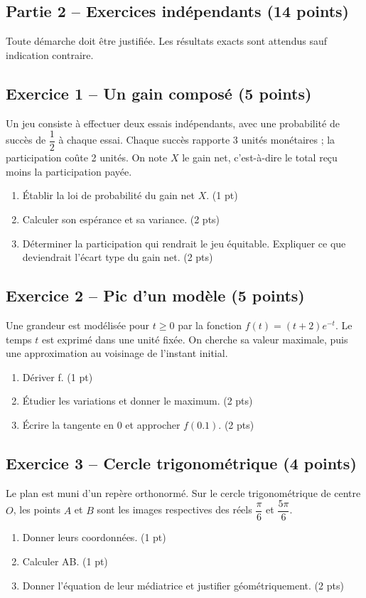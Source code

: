 \mxnewpage\subsection*{Partie 2 -- Exercices indépendants (14 points)}
Toute démarche doit être justifiée. Les résultats exacts sont attendus sauf indication contraire.
\subsection*{Exercice 1 -- Un gain composé (5 points)}
Un jeu consiste à effectuer deux essais indépendants, avec une probabilité de succès de $\dfrac12$ à chaque essai. Chaque succès rapporte 3 unités monétaires ; la participation coûte 2 unités. On note $X$ le gain net, c’est-à-dire le total reçu moins la participation payée.
\begin{enumerate}
\item Établir la loi de probabilité du gain net $X$. \hfill(1 pt)
\item Calculer son espérance et sa variance. \hfill(2 pts)
\item Déterminer la participation qui rendrait le jeu équitable. Expliquer ce que deviendrait l’écart type du gain net. \hfill(2 pts)
\end{enumerate}
\subsection*{Exercice 2 -- Pic d’un modèle (5 points)}
Une grandeur est modélisée pour $t\geq0$ par la fonction $f(t)=(t+2)e^{-t}$. Le temps $t$ est exprimé dans une unité fixée. On cherche sa valeur maximale, puis une approximation au voisinage de l’instant initial.
\begin{enumerate}
\item Dériver f. \hfill(1 pt)
\item Étudier les variations et donner le maximum. \hfill(2 pts)
\item Écrire la tangente en 0 et approcher $f(\num{0,1})$. \hfill(2 pts)
\end{enumerate}
\subsection*{Exercice 3 -- Cercle trigonométrique (4 points)}
Le plan est muni d’un repère orthonormé. Sur le cercle trigonométrique de centre $O$, les points $A$ et $B$ sont les images respectives des réels $\dfrac\pi6$ et $\dfrac{5\pi}6$.
\begin{enumerate}
\item Donner leurs coordonnées. \hfill(1 pt)
\item Calculer AB. \hfill(1 pt)
\item Donner l’équation de leur médiatrice et justifier géométriquement. \hfill(2 pts)
\end{enumerate}
